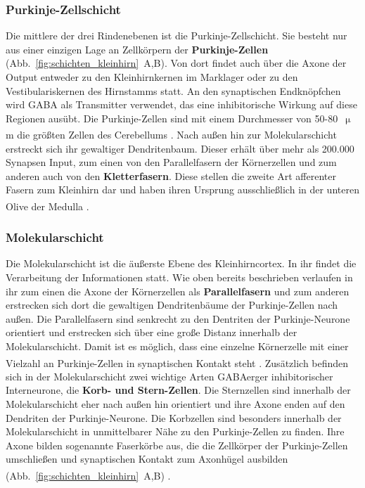 \documentclass[12pt,a4paper,pdftex]{article}
\begin{document}
\subsubsection*{Purkinje-Zellschicht} 
Die mittlere der drei Rindenebenen ist die Purkinje-Zellschicht. Sie besteht nur aus einer einzigen Lage an Zellkörpern der \textbf{Purkinje-Zellen} (Abb.~\ref{fig:schichten_kleinhirn}~A,B). Von dort findet auch über die Axone der Output entweder zu den Kleinhirnkernen im Marklager oder zu den Vestibulariskernen des Hirnstamms statt. An den synaptischen Endknöpfchen wird GABA als Transmitter verwendet, das eine inhibitorische Wirkung auf diese Regionen ausübt. Die Purkinje-Zellen sind mit einem Durchmesser von 50-80~$\upmu$m die größten Zellen des Cerebellums \textsuperscript{\cite[42]{kandel2013principles}}. Nach außen hin zur Molekularschicht erstreckt sich ihr gewaltiger Dendritenbaum. Dieser erhält über mehr als 200.000 Synapsen Input, zum einen von den Parallelfasern der Körnerzellen und zum anderen auch von den \textbf{Kletterfasern}. Diese stellen die zweite Art afferenter Fasern zum Kleinhirn dar und haben ihren Ursprung ausschließlich in der unteren Olive der Medulla \textsuperscript{\cite[7]{trepel2011neuroanatomie}}.   


\subsubsection*{Molekularschicht} 
Die Molekularschicht ist die äußerste Ebene des Kleinhirncortex. In ihr findet die Verarbeitung der Informationen statt. Wie oben bereits beschrieben verlaufen in ihr zum einen die Axone der Körnerzellen als \textbf{Parallelfasern} und zum anderen erstrecken sich dort die gewaltigen Dendritenbäume der Purkinje-Zellen nach außen. Die Parallelfasern sind senkrecht zu den Dentriten der Purkinje-Neurone orientiert und erstrecken sich über eine große Distanz innerhalb der Molekularschicht. Damit ist es möglich, dass eine einzelne Körnerzelle mit einer Vielzahl an Purkinje-Zellen in synaptischen Kontakt steht \textsuperscript{\cite[42]{kandel2013principles}}. Zusätzlich befinden sich in der Molekularschicht zwei wichtige Arten GABAerger inhibitorischer Interneurone, die \textbf{Korb- und Stern-Zellen}. Die Sternzellen sind innerhalb der Molekularschicht eher nach außen hin orientiert und ihre Axone enden auf den Dendriten der Purkinje-Neurone. Die Korbzellen sind besonders innerhalb der Molekularschicht in unmittelbarer Nähe zu den Purkinje-Zellen zu finden. Ihre Axone bilden sogenannte Faserkörbe aus, die die Zellkörper der Purkinje-Zellen umschließen und synaptischen Kontakt zum Axonhügel ausbilden (Abb.~\ref{fig:schichten_kleinhirn}~A,B) \textsuperscript{\cite[9]{paxinos2014rat}}.   
\end{document}
